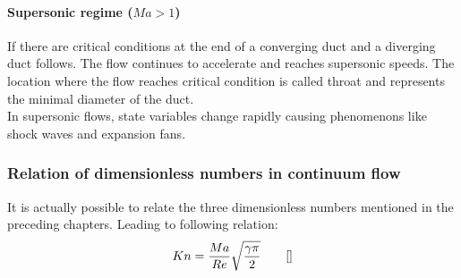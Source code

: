 	\paragraph{Supersonic regime (\(Ma > 1\))} 
		If there are critical conditions at the end of a converging duct and a diverging duct follows.
		The flow continues to accelerate and reaches supersonic speeds.
		The location where the flow reaches critical condition is called throat and represents the minimal diameter of the duct.\\
		In supersonic flows, state variables change rapidly causing phenomenons like shock waves and expansion fans.
	
		
\subsubsection*{Relation of dimensionless numbers in continuum flow}
	It is actually possible to relate the three dimensionless numbers mentioned in the preceding chapters.
	Leading to following relation:
	$$
		Kn = \frac{Ma}{Re}\sqrt{\frac{\gamma \pi}{2}} \qquad \eqref{}
	$$
